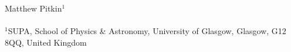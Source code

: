 \iflatexml
Matthew Pitkin$^1$ \\ ~\\
$^1$SUPA, School of Physics \& Astronomy, University of Glasgow, Glasgow, G12 8QQ, United Kingdom \\
\else
\author{Matthew Pitkin}
\fi